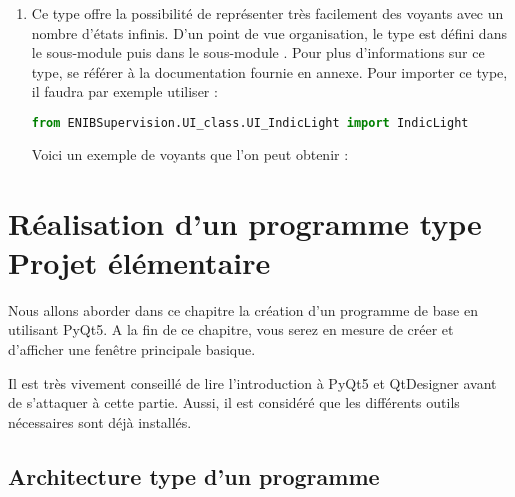 \begin{enumerate}
\newpage

\item {}\newline
Ce type offre la possibilité de représenter très facilement des voyants avec un nombre d'états infinis.\newline
D'un point de vue organisation, le type  est défini dans le sous-module  puis dans le sous-module \newline {}.\newline
Pour plus d'informations sur ce type, se référer à la documentation fournie en annexe.\newline
Pour importer ce type, il faudra par exemple utiliser :
\begin{lstlisting}[language=Python]
from ENIBSupervision.UI_class.UI_IndicLight import IndicLight
\end{lstlisting}
Voici un exemple de voyants que l'on peut obtenir :

\end{enumerate}





\chapter{Réalisation d'un programme type\protect\\Projet élémentaire}

Nous allons aborder dans ce chapitre la création d'un programme de base en utilisant PyQt5. A la fin de ce chapitre, vous serez en mesure de créer et d'afficher une fenêtre principale basique.\smallSkip

Il est très vivement conseillé de lire l'introduction à PyQt5 et QtDesigner avant de s'attaquer à cette partie. Aussi, il est considéré que les différents outils nécessaires sont déjà installés.



\section{Architecture type d'un programme}

